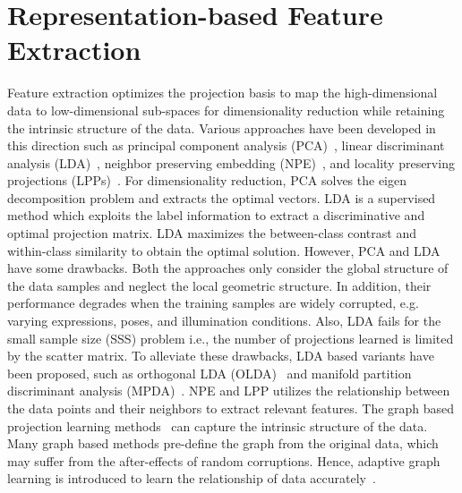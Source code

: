 \section{Representation-based Feature Extraction}
\label{sec: Chap2_Sub_learn}
%
Feature extraction optimizes the projection basis to map the high-dimensional data to low-dimensional sub-spaces for dimensionality reduction while retaining the intrinsic structure of the data. Various approaches have been developed in this direction such as principal component analysis (PCA)~\cite{PCA}, linear discriminant analysis (LDA)~\cite{LDA}, neighbor preserving embedding (NPE)~\cite{NPE}, and locality preserving projections (LPPs)~\cite{LPP}. For dimensionality reduction, PCA solves the eigen decomposition problem and extracts the optimal vectors. LDA is a supervised method which exploits the label information to extract a discriminative and optimal projection matrix. LDA maximizes the between-class contrast and within-class similarity to obtain the optimal solution. However, PCA and LDA have some drawbacks. Both the approaches only consider the global structure of the data samples and neglect the local geometric structure. In addition, their performance degrades when the training samples are widely corrupted, e.g. varying expressions, poses, and illumination conditions. Also, LDA fails for the small sample size (SSS) problem i.e., the number of projections learned is limited by the scatter matrix. To alleviate these drawbacks, LDA based variants have been proposed, such as orthogonal LDA (OLDA)~\cite{OLDA} and manifold partition discriminant analysis (MPDA)~\cite{MPDA}. NPE and LPP utilizes the relationship between the data points and their neighbors to extract relevant features. The graph based projection learning methods~\cite{LPP,Sub_Adaptive_graph} can capture the intrinsic structure of the data. Many graph based methods pre-define the graph from the original data, which may suffer from the after-effects of random corruptions. Hence, adaptive graph learning is introduced to learn the relationship of data accurately~\cite{Sub_Adaptive_graph,Clustering_adaptive}.

